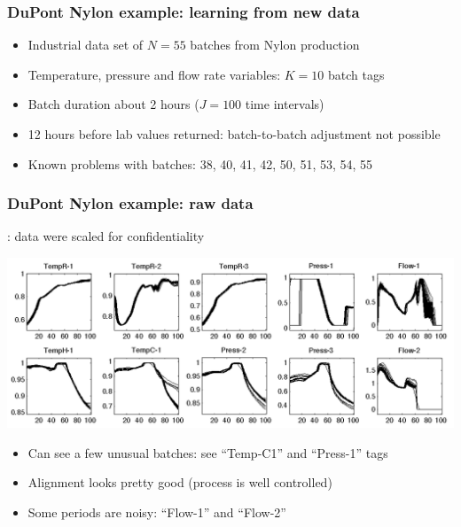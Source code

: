 \begin{frame}\frametitle{DuPont Nylon example: learning from new data}

	\begin{itemize}
		\item	Industrial data set of \( N = 55 \) batches from Nylon production
		
		\item	Temperature, pressure and flow rate variables: \( K = 10\)  batch tags
		
		\item	Batch duration about 2 hours (\( J=100 \) time intervals)
		
		\item	12 hours before lab values returned: batch-to-batch adjustment not possible
		
		\item	Known problems with batches: 38, 40, 41, 42, 50, 51, 53, 54, 55
	\end{itemize}
	
	
\end{frame}

\begin{frame}\frametitle{DuPont Nylon example: raw data}
	{\color{myGreen}{Note}}: data were scaled for confidentiality
	\begin{center}
		\includegraphics[width=\textwidth]{images/dupont/dupont-raw-data-trajectories.png}
	\end{center}
	
	\vspace{1cm}
	\begin{itemize}
		\item	Can see a few unusual batches: see ``Temp-C1'' and ``Press-1'' tags
		
		\item	Alignment looks pretty good (process is well controlled)
		
		\item	Some periods are noisy: ``Flow-1'' and ``Flow-2''
	\end{itemize}
\end{frame}

